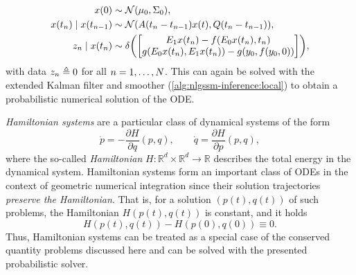 \documentclass{mimosis}
\begin{document}
\begin{subequations}
\begin{align}
  \st(0) &\sim \N( \mu_0, \Sigma_0 ), \\
  \st(t_\idxt) \mid \st(t_{\idxt-1}) &\sim \N( \transA(t_\idxt - t_{\idxt-1}) \st(t), \transC(t_\idxt - t_{\idxt-1}) ), \\
  \sobs_\idxt \mid \st(t_\idxt) &\sim \dirac( \begin{bmatrix} \proj{1} \st(t_\idxt) - \vf(\proj{0} \st(t_\idxt), t_\idxt) \\ g(\proj{0} \st(t_\idxt), \proj{1} \st(t_\idxt)) - g(\val_0, \vf(\val_0, 0)) \end{bmatrix} ),
\end{align}
\end{subequations}
with data \(z_n \triangleq 0\) for all \(n = 1, \dots, N\).
This can again be solved with the extended Kalman filter and smoother (\cref{alg:nlgssm-inference:local}) to obtain a probabilistic numerical solution of the ODE.

\begin{remark}
\emph{Hamiltonian systems} are a particular class of dynamical systems of the form
\begin{equation}
  \label{eq:hamiltonian-ode}
  \dot{p} = - \frac{\partial H}{\partial q} (p, q), \qquad
  \dot{q} = \frac{\partial H}{\partial p} (p, q),
\end{equation}
where the so-called \emph{Hamiltonian}
\(H: \mathbb{R}^d \times \mathbb{R}^d \to \mathbb{R}\)
describes the total energy in the dynamical system.
Hamiltonian systems form an important class of ODEs in the context of geometric numerical integration
\parencite{hairer2006geometric}
since their
solution trajectories
\emph{preserve the Hamiltonian}.
That is, for a solution \((p(t), q(t))\) of such problems, the Hamiltonian \(H(p(t), q(t))\) is constant, and it holds
\begin{equation}
  \label{eq:hamiltonian-energy}
  H(p(t), q(t)) - H(p(0), q(0)) \equiv 0.
\end{equation}
Thus, Hamiltonian systems can be treated as a special case of the conserved quantity problems discussed here and can be solved with the presented probabilistic solver.
\end{remark}
\end{document}
